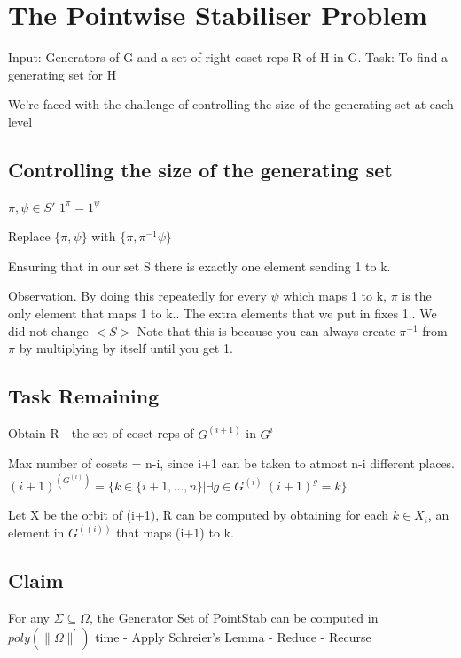 
\section{The Pointwise Stabiliser Problem}
Input: Generators of G and a set of right coset reps R of H in G.\newline
Task: To find a generating set for H\newline

We're faced with the challenge of controlling the size of the generating set at each level

\subsection{Controlling the size of the generating set}
$\pi, \psi \in S'$
$1^\pi = 1^\psi$

Replace $\{ \pi, \psi \}$ with $\{ \pi, \pi^{-1} \psi\}$

Ensuring that in our set S there is exactly one element sending 1 to k.

Observation. By doing this repeatedly for every $\psi$ which maps 1 to k, $\pi$ is the only element that maps 1 to k.. The extra elements that we put in fixes 1.. We did not change $<S>$\newline
Note that this is because you can always create $\pi^{-1}$  from $\pi$ by multiplying by itself until you get 1.\newline



\subsection{Task Remaining}
Obtain R - the set of coset reps of $G^{(i+1)}$  in $G^i$

Max number of cosets = n-i, since i+1 can be taken to atmost n-i different places.\newline
$(i+1)^{(G^{(i)})}=\{ k \in \{i+1, . . ., n\} | \exists g \in G^{(i)} \: (i+1)^g = k\} $

Let X be the orbit of (i+1), R can be computed by obtaining for each $k \in X_i$, an element in $G^((i) )$  that maps (i+1) to k.

\subsection{Claim}
For any $\Sigma\subseteq\Omega$, the Generator Set of PointStab can be computed in $poly(\|\Omega\|^{'} )$  time\newline
	- Apply Schreier's Lemma\newline
	- Reduce\newline
	- Recurse\newline

